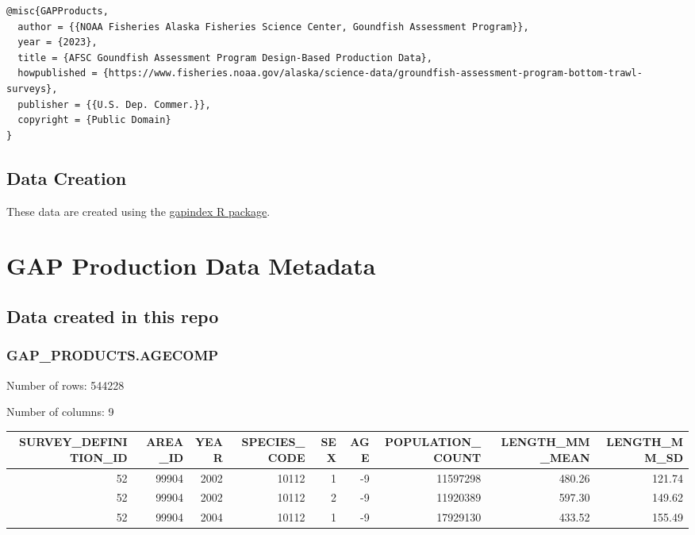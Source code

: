 \documentclass[
  letterpaper,
  oneside,
  open=any]{scrbook}
\begin{document}
\begin{verbatim}
@misc{GAPProducts,
  author = {{NOAA Fisheries Alaska Fisheries Science Center, Goundfish Assessment Program}},
  year = {2023}, 
  title = {AFSC Goundfish Assessment Program Design-Based Production Data},
  howpublished = {https://www.fisheries.noaa.gov/alaska/science-data/groundfish-assessment-program-bottom-trawl-surveys},
  publisher = {{U.S. Dep. Commer.}},
  copyright = {Public Domain} 
}
\end{verbatim}

\hypertarget{data-creation}{%
\section*{Data Creation}\label{data-creation}}


These data are created using the
\href{https://github.com/afsc-gap-products/gapindex}{gapindex R
package}.

\hypertarget{gap-production-data-metadata}{%
\chapter{GAP Production Data
Metadata}\label{gap-production-data-metadata}}

\hypertarget{data-created-in-this-repo}{%
\section{Data created in this repo}\label{data-created-in-this-repo}}

\hypertarget{gap_products.agecomp}{%
\subsection{GAP\_PRODUCTS.AGECOMP}\label{gap_products.agecomp}}

Number of rows: 544228

Number of columns: 9

\begin{tabular}{r|r|r|r|r|r|r|r|r}
\hline
SURVEY\_DEFINITION\_ID & AREA\_ID & YEAR & SPECIES\_CODE & SEX & AGE & POPULATION\_COUNT & LENGTH\_MM\_MEAN & LENGTH\_MM\_SD\\
\hline
52 & 99904 & 2002 & 10112 & 1 & -9 & 11597298 & 480.26 & 121.74\\
\hline
52 & 99904 & 2002 & 10112 & 2 & -9 & 11920389 & 597.30 & 149.62\\
\hline
52 & 99904 & 2004 & 10112 & 1 & -9 & 17929130 & 433.52 & 155.49\\
\hline
\end{tabular}
\end{document}
